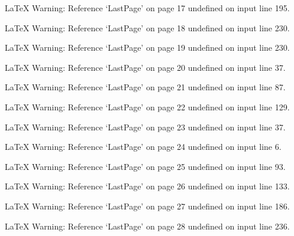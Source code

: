 LaTeX Warning: Reference `LastPage' on page 17 undefined on input line 195.


LaTeX Warning: Reference `LastPage' on page 18 undefined on input line 230.


LaTeX Warning: Reference `LastPage' on page 19 undefined on input line 230.


LaTeX Warning: Reference `LastPage' on page 20 undefined on input line 37.


LaTeX Warning: Reference `LastPage' on page 21 undefined on input line 87.


LaTeX Warning: Reference `LastPage' on page 22 undefined on input line 129.


LaTeX Warning: Reference `LastPage' on page 23 undefined on input line 37.


LaTeX Warning: Reference `LastPage' on page 24 undefined on input line 6.


LaTeX Warning: Reference `LastPage' on page 25 undefined on input line 93.


LaTeX Warning: Reference `LastPage' on page 26 undefined on input line 133.


LaTeX Warning: Reference `LastPage' on page 27 undefined on input line 186.



LaTeX Warning: Reference `LastPage' on page 28 undefined on input line 236.


